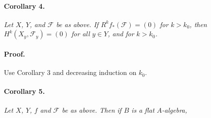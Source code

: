 \paragraph{Corollary 4.}
\textit{Let $X$, $Y$, and $\mathscr{F}$ be as above. If
$R^k f_*(\mathscr{F}) = (0)$ for $k > k_0$, then
$H^k(X_y, \mathscr{F}_y) = (0)$ for all $y \in Y$, and for $k > k_0$.}

\paragraph{Proof.}
Use Corollary 3 and decreasing induction on $k_0$.

\paragraph{Corollary 5.}
\textit{Let $X$, $Y$, $f$ and $\mathscr{F}$ be as above. Then if $B$ is a
flat $A$-algebra,}
